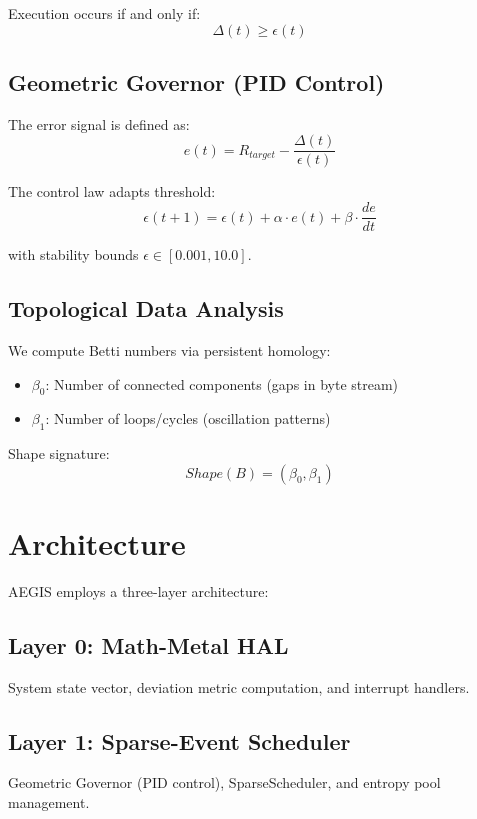\documentclass[conference]{IEEEtran}
\begin{document}
Execution occurs if and only if:
\begin{equation}
\Delta(t) \geq \epsilon(t)
\end{equation}

\subsection{Geometric Governor (PID Control)}

The error signal is defined as:
\begin{equation}
e(t) = R_{target} - \frac{\Delta(t)}{\epsilon(t)}
\end{equation}

The control law adapts threshold:
\begin{equation}
\epsilon(t+1) = \epsilon(t) + \alpha \cdot e(t) + \beta \cdot \frac{de}{dt}
\end{equation}

with stability bounds $\epsilon \in [0.001, 10.0]$.

\subsection{Topological Data Analysis}

We compute Betti numbers via persistent homology:
\begin{itemize}
\item $\beta_0$: Number of connected components (gaps in byte stream)
\item $\beta_1$: Number of loops/cycles (oscillation patterns)
\end{itemize}

Shape signature:
\begin{equation}
Shape(B) = (\beta_0, \beta_1)
\end{equation}

\section{Architecture}

AEGIS employs a three-layer architecture:

\subsection{Layer 0: Math-Metal HAL}
System state vector, deviation metric computation, and interrupt handlers.

\subsection{Layer 1: Sparse-Event Scheduler}
Geometric Governor (PID control), SparseScheduler, and entropy pool management.
\end{document}
